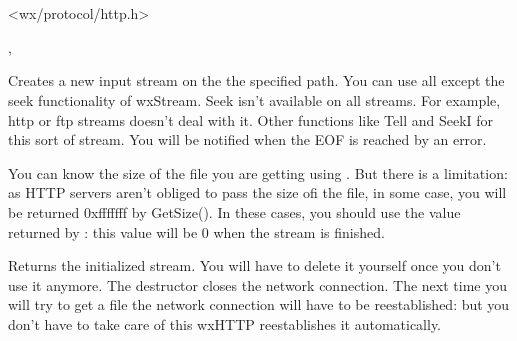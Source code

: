 \section{}\label{wxhttp}




<wx/protocol/http.h>


, 


\label{wxhttpgetinputstream}


Creates a new input stream on the the specified path. You can use all except the seek
functionality of wxStream. Seek isn't available on all streams. For example,
http or ftp streams doesn't deal with it. Other functions like Tell and SeekI
for this sort of stream.
You will be notified when the EOF is reached by an error.


You can know the size of the file you are getting using .
But there is a limitation: as HTTP servers aren't obliged to pass the size ofi
the file, in some case, you will be returned 0xfffffff by GetSize(). In these
cases, you should use the value returned by :
this value will be 0 when the stream is finished.


Returns the initialized stream. You will have to delete it yourself once you
don't use it anymore. The destructor closes the network connection.
The next time you will try to get a file the network connection will have
to be reestablished: but you don't have to take care of this wxHTTP reestablishes it automatically.




